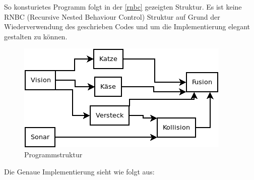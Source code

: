 \documentclass[11pt,a4paper]{article}
\begin{document}
So konsturietes Programm folgt in der \autoref{rnbc} gezeigten Struktur. Es ist keine RNBC (Recursive Nested Behaviour Control) \cite{rnbc} Struktur auf Grund der Wiederverwendung des geschrieben Codes und um die Implementierung elegant gestalten zu können.    
\begin{figure}[H]
\centering
\includegraphics[scale=0.7]{media/struktur.png}
\caption{Programmstruktur}\label{rnbc}
\end{figure}
Die Genaue Implementierung sieht wie folgt aus:
\end{document}

